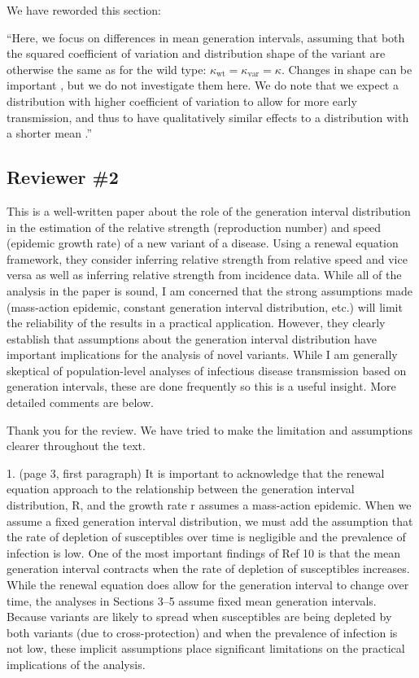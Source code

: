 \documentclass[12pt]{article}
\newcommand{\rev}{\subsection*}
\newcommand{\revtext}{\textsf}
\begin{document}
We have reworded this section:

``Here, we focus on differences in mean generation intervals, assuming that both the squared coefficient of variation and distribution shape of the variant are otherwise the same as for the wild type: $\kappa_{\mathrm{wt}} = \kappa_{\mathrm{var}} = \kappa$.
Changes in shape can be important \citep{miller2010epidemics,svensson2015influence}, but we do not investigate them here. 
We do note that we expect a distribution with higher coefficient of variation to allow for more early transmission, and thus to have qualitatively similar effects to a distribution with a shorter mean \citep{park2019practical}.''

\rev{Reviewer \#2}

\revtext{This is a well-written paper about the role of the generation interval distribution in the estimation of the relative strength (reproduction number) and speed
(epidemic growth rate) of a new variant of a disease. Using a renewal equation
framework, they consider inferring relative strength from relative speed and vice
versa as well as inferring relative strength from incidence data. While all of the
analysis in the paper is sound, I am concerned that the strong assumptions made
(mass-action epidemic, constant generation interval distribution, etc.) will limit
the reliability of the results in a practical application. However, they clearly
establish that assumptions about the generation interval distribution have important implications for the analysis of novel variants. While I am generally
skeptical of population-level analyses of infectious disease transmission based
on generation intervals, these are done frequently so this is a useful insight.
More detailed comments are below.}

Thank you for the review. 
We have tried to make the limitation and assumptions clearer throughout the text.

\revtext{1. (page 3, first paragraph) It is important to acknowledge that the renewal equation approach to the relationship between the generation interval
distribution, R, and the growth rate r assumes a mass-action epidemic.
When we assume a fixed generation interval distribution, we must add the
assumption that the rate of depletion of susceptibles over time is negligible and the prevalence of infection is low. One of the most important
findings of Ref 10 is that the mean generation interval contracts when the
rate of depletion of susceptibles increases. While the renewal equation
does allow for the generation interval to change over time, the analyses
in Sections 3–5 assume fixed mean generation intervals. Because variants
are likely to spread when susceptibles are being depleted by both variants
(due to cross-protection) and when the prevalence of infection is not low, these implicit assumptions place significant limitations on the practical
implications of the analysis.}
\end{document}
